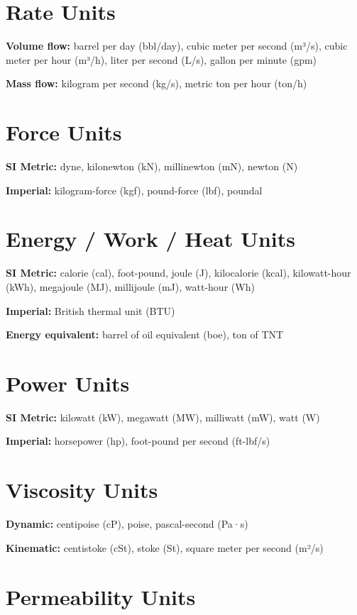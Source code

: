 \documentclass[11pt,a4paper]{report}
\begin{document}
\section{Rate Units}

\textbf{Volume flow:} barrel per day (bbl/day), cubic meter per second (m³/s), cubic meter per hour (m³/h), liter per second (L/s), gallon per minute (gpm)

\textbf{Mass flow:} kilogram per second (kg/s), metric ton per hour (ton/h)

\section{Force Units}

\textbf{SI Metric:} dyne, kilonewton (kN), millinewton (mN), newton (N)

\textbf{Imperial:} kilogram-force (kgf), pound-force (lbf), poundal

\section{Energy / Work / Heat Units}

\textbf{SI Metric:} calorie (cal), foot-pound, joule (J), kilocalorie (kcal), kilowatt-hour (kWh), megajoule (MJ), millijoule (mJ), watt-hour (Wh)

\textbf{Imperial:} British thermal unit (BTU)

\textbf{Energy equivalent:} barrel of oil equivalent (boe), ton of TNT

\section{Power Units}

\textbf{SI Metric:} kilowatt (kW), megawatt (MW), milliwatt (mW), watt (W)

\textbf{Imperial:} horsepower (hp), foot-pound per second (ft-lbf/s)

\section{Viscosity Units}

\textbf{Dynamic:} centipoise (cP), poise, pascal-second (Pa·s)

\textbf{Kinematic:} centistoke (cSt), stoke (St), square meter per second (m²/s)

\section{Permeability Units}
\end{document}
